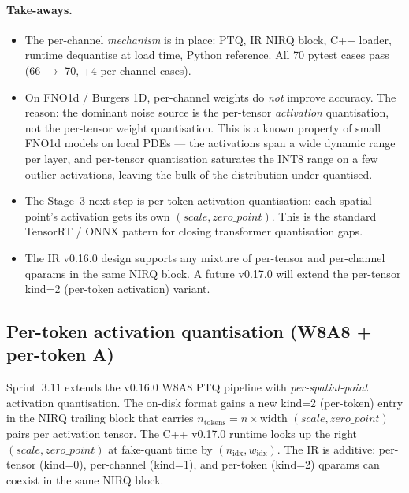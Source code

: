 \documentclass[10pt,twocolumn]{article}
\renewcommand{\texttt}[1]{{\normalfont\ttfamily #1}\normalfont\rmfamily}
\begin{document}
\paragraph{Take-aways.}
\begin{itemize}
\item The per-channel \emph{mechanism} is in place:
PTQ, IR NIRQ block, C{++} loader, runtime dequantise
at load time, Python reference.  All 70 pytest cases
pass (66 $\to$ 70, +4 per-channel cases).
\item On FNO1d / Burgers 1D, per-channel weights do
\emph{not} improve accuracy.  The reason: the
dominant noise source is the per-tensor \emph{activation}
quantisation, not the per-tensor weight
quantisation.  This is a known property of small
FNO1d models on local PDEs --- the activations span
a wide dynamic range per layer, and per-tensor
quantisation saturates the INT8 range on a few
outlier activations, leaving the bulk of the
distribution under-quantised.
\item The Stage~3 next step is per-token activation
quantisation: each spatial point's activation gets
its own $(scale, zero\_point)$.  This is the
standard TensorRT / ONNX pattern for closing
transformer quantisation gaps.
\item The IR v0.16.0 design supports any mixture of
per-tensor and per-channel qparams in the same NIRQ
block.  A future v0.17.0 will extend the per-tensor
\texttt{kind=2} (per-token activation) variant.
\end{itemize}

\subsection{Per-token activation quantisation (W8A8 + per-token A)}
\label{sec:int8-per-token}

Sprint~3.11 extends the v0.16.0 W8A8 PTQ pipeline
with \emph{per-spatial-point} activation quantisation.
The on-disk format gains a new
\texttt{kind=2} (per-token) entry in the NIRQ trailing
block that carries $n_{\mathrm{tokens}} = n \times
\mathrm{width}$ $(scale, zero\_point)$ pairs per
activation tensor.  The C{++} v0.17.0 runtime looks up
the right $(scale, zero\_point)$ at fake-quant time
by $(n_{\mathrm{idx}}, w_{\mathrm{idx}})$.  The IR is
additive: per-tensor (\texttt{kind=0}), per-channel
(\texttt{kind=1}), and per-token (\texttt{kind=2})
qparams can coexist in the same NIRQ block.
\end{document}
